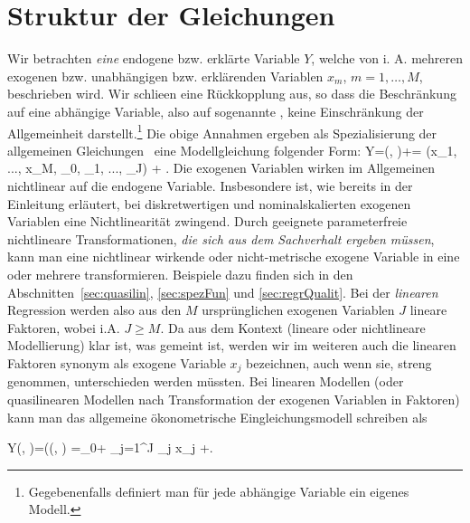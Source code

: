 \section{\label{sec:stetigStruktur}Struktur der Gleichungen}

Wir betrachten \textit{eine}
endogene bzw. erkl\"arte
Variable $Y$, welche von i. A.  mehreren
exogenen bzw. unabh\"angigen bzw. erkl\"arenden Variablen $x_m$, $m=1,
\ldots, M$,
beschrieben wird. 
Wir schlie\3en eine R\"uckkopplung aus, so dass die Beschr\"ankung
auf eine abh\"angige Variable, also auf sogenannte
 , 
keine Einschr\"ankung der
Allgemeinheit darstellt.\footnote{Gegebenenfalls definiert man
 f\"ur jede abh\"angige Variable ein
eigenes Modell.}
Die obige Annahmen ergeben als Spezialisierung der allgemeinen
Gleichungen~ eine Modellgleichung folgender Form:
\be
\label{oekonY}
Y=(, \vec{\beta})+\epsilon = (x_1, ..., x_M,
\beta_0, \beta_1, ..., \beta_J) + \epsilon. 
\ee
Die exogenen Variablen wirken im Allgemeinen nichtlinear auf die
endogene Variable. Insbesondere ist, wie bereits in der Einleitung
erl\"autert, bei diskretwertigen und nominalskalierten
exogenen Variablen eine Nichtlinearit\"at zwingend. Durch geeignete
parameterfreie nichtlineare Transformationen, \emph{die sich aus dem Sachverhalt
  ergeben m\"ussen}, kann man eine nichtlinear wirkende oder
nicht-metrische exogene Variable in eine oder mehrere  transformieren. Beispiele dazu finden sich in den
Abschnitten~\ref{sec:quasilin}, \ref{sec:spezFun} und \ref{sec:regrQualit}. Bei der
\emph{linearen} Regression werden also aus den $M$ urspr\"unglichen exogenen
Variablen $J$ lineare Faktoren, wobei i.A. $J\ge M$. Da aus dem
Kontext (lineare oder nichtlineare Modellierung) klar ist, was gemeint
ist, werden wir im weiteren auch die linearen Faktoren synonym als exogene
Variable $x_j$ bezeichnen, auch wenn sie, streng genommen,
unterschieden werden m\"ussten.  
Bei linearen Modellen (oder quasilinearen Modellen nach Transformation
der exogenen Variablen in Faktoren) kann man das allgemeine \"okonometrische
Eingleichungsmodell  schreiben als

{Y\left(, \vec{\beta}\right)=(\left(, \vec{\beta}\right)
=\beta_0+ \sum\limits_{j=1}^J \beta_j x_j +\epsilon.
}

